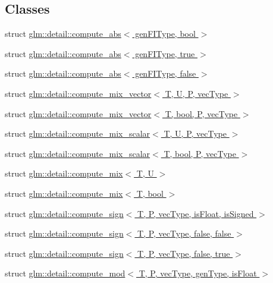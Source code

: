 \subsection*{Classes}
\begin{DoxyCompactItemize}
\item 
struct \hyperlink{structglm_1_1detail_1_1compute__abs}{glm\-::detail\-::compute\-\_\-abs$<$ gen\-F\-I\-Type, bool $>$}
\item 
struct \hyperlink{structglm_1_1detail_1_1compute__abs_3_01gen_f_i_type_00_01true_01_4}{glm\-::detail\-::compute\-\_\-abs$<$ gen\-F\-I\-Type, true $>$}
\item 
struct \hyperlink{structglm_1_1detail_1_1compute__abs_3_01gen_f_i_type_00_01false_01_4}{glm\-::detail\-::compute\-\_\-abs$<$ gen\-F\-I\-Type, false $>$}
\item 
struct \hyperlink{structglm_1_1detail_1_1compute__mix__vector}{glm\-::detail\-::compute\-\_\-mix\-\_\-vector$<$ T, U, P, vec\-Type $>$}
\item 
struct \hyperlink{structglm_1_1detail_1_1compute__mix__vector_3_01_t_00_01bool_00_01_p_00_01vec_type_01_4}{glm\-::detail\-::compute\-\_\-mix\-\_\-vector$<$ T, bool, P, vec\-Type $>$}
\item 
struct \hyperlink{structglm_1_1detail_1_1compute__mix__scalar}{glm\-::detail\-::compute\-\_\-mix\-\_\-scalar$<$ T, U, P, vec\-Type $>$}
\item 
struct \hyperlink{structglm_1_1detail_1_1compute__mix__scalar_3_01_t_00_01bool_00_01_p_00_01vec_type_01_4}{glm\-::detail\-::compute\-\_\-mix\-\_\-scalar$<$ T, bool, P, vec\-Type $>$}
\item 
struct \hyperlink{structglm_1_1detail_1_1compute__mix}{glm\-::detail\-::compute\-\_\-mix$<$ T, U $>$}
\item 
struct \hyperlink{structglm_1_1detail_1_1compute__mix_3_01_t_00_01bool_01_4}{glm\-::detail\-::compute\-\_\-mix$<$ T, bool $>$}
\item 
struct \hyperlink{structglm_1_1detail_1_1compute__sign}{glm\-::detail\-::compute\-\_\-sign$<$ T, P, vec\-Type, is\-Float, is\-Signed $>$}
\item 
struct \hyperlink{structglm_1_1detail_1_1compute__sign_3_01_t_00_01_p_00_01vec_type_00_01false_00_01false_01_4}{glm\-::detail\-::compute\-\_\-sign$<$ T, P, vec\-Type, false, false $>$}
\item 
struct \hyperlink{structglm_1_1detail_1_1compute__sign_3_01_t_00_01_p_00_01vec_type_00_01false_00_01true_01_4}{glm\-::detail\-::compute\-\_\-sign$<$ T, P, vec\-Type, false, true $>$}
\item 
struct \hyperlink{structglm_1_1detail_1_1compute__mod}{glm\-::detail\-::compute\-\_\-mod$<$ T, P, vec\-Type, gen\-Type, is\-Float $>$}
\end{DoxyCompactItemize}
